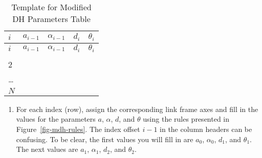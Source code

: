 \documentclass[
  letterpaper,
  DIV=11,
  numbers=noendperiod]{scrreprt}
\providecommand{\tightlist}{%
  \setlength{\itemsep}{0pt}\setlength{\parskip}{0pt}}\usepackage{longtable,booktabs,array}
\begin{document}
\hypertarget{tbl-mdh-template}{}
\begin{longtable}[]{@{}lllll@{}}
\caption{\label{tbl-mdh-template}Template for Modified DH Parameters
Table}\tabularnewline
\toprule\noalign{}
\(i\) & \(a_{i-1}\) & \(\alpha_{i-1}\) & \(d_i\) & \(\theta_i\) \\
\midrule\noalign{}
\endfirsthead
\toprule\noalign{}
\(i\) & \(a_{i-1}\) & \(\alpha_{i-1}\) & \(d_i\) & \(\theta_i\) \\
\midrule\noalign{}
\endhead
\bottomrule\noalign{}
\endlastfoot
1 & & & & \\
2 & & & & \\
\ldots{} & & & & \\
\(N\) & & & & \\
\end{longtable}

\begin{enumerate}
\def\labelenumi{\arabic{enumi}.}
\setcounter{enumi}{1}
\tightlist
\item
  For each index (row), assign the corresponding link frame axes and
  fill in the values for the parameters \(a\), \(\alpha\), \(d\), and
  \(\theta\) using the rules presented in Figure~\ref{fig-mdh-rules}.
  The index offset \(i-1\) in the column headers can be confusing. To be
  clear, the first values you will fill in are \(a_0\), \(\alpha_0\),
  \(d_1\), and \(\theta_1\). The next values are \(a_1\), \(\alpha_1\),
  \(d_2\), and \(\theta_2\).
\end{enumerate}
\end{document}
